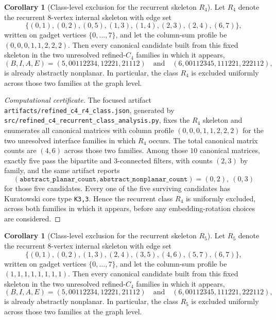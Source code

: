\documentclass[12pt]{article}
\theoremstyle{definition}
\newtheorem{corollary}[theorem]{Corollary}
\begin{document}
\begin{corollary}[Class-level exclusion for the recurrent skeleton $R_4$]
\label{cor:r4-class-exclusion}
Let $R_4$ denote the recurrent $8$-vertex internal skeleton with edge set
\[
\{(0,1),(0,2),(0,5),(1,3),(1,4),(2,3),(2,4),(6,7)\},
\]
written on gadget vertices $\{0,\dots,7\}$, and let the column-sum profile be $(0,0,0,1,1,2,2,2)$. Then every canonical candidate built from this fixed skeleton in the two unresolved refined-$C_4$ families in which it appears,
\[
(B,I,A,E)=(5,00112234,12221,21112)\quad\text{and}\quad (6,00112345,111221,222112),
\]
is already abstractly nonplanar. In particular, the class $R_4$ is excluded uniformly across those two families at the graph level.
\end{corollary}

\begin{proof}[Computational certificate]
The focused artifact \texttt{artifacts/refined\_c4\_r4\_class.json}, generated by \texttt{src/refined\_c4\_recurrent\_class\_analysis.py}, fixes the $R_4$ skeleton and enumerates all canonical matrices with column profile $(0,0,0,1,1,2,2,2)$ for the two unresolved interface families in which $R_4$ occurs. The total canonical matrix counts are $(4,6)$ across those two families. Among those $10$ canonical matrices, exactly five pass the bipartite and $3$-connected filters, with counts $(2,3)$ by family, and the same artifact reports
\[
(\texttt{abstract\_planar\_count},\texttt{abstract\_nonplanar\_count})=(0,2),\ (0,3)
\]
for those five candidates. Every one of the five surviving candidates has Kuratowski core type \texttt{K3,3}. Hence the recurrent class $R_4$ is uniformly excluded, across both families in which it appears, before any embedding-rotation choices are considered.
\end{proof}

\begin{corollary}[Class-level exclusion for the recurrent skeleton $R_5$]
\label{cor:r5-class-exclusion}
Let $R_5$ denote the recurrent $8$-vertex internal skeleton with edge set
\[
\{(0,1),(0,2),(1,3),(2,4),(3,5),(4,6),(5,7),(6,7)\},
\]
written on gadget vertices $\{0,\dots,7\}$, and let the column-sum profile be $(1,1,1,1,1,1,1,1)$. Then every canonical candidate built from this fixed skeleton in the two unresolved refined-$C_4$ families in which it appears,
\[
(B,I,A,E)=(5,00112234,12221,21112)\quad\text{and}\quad (6,00112345,111221,222112),
\]
is already abstractly nonplanar. In particular, the class $R_5$ is excluded uniformly across those two families at the graph level.
\end{corollary}
\end{document}
